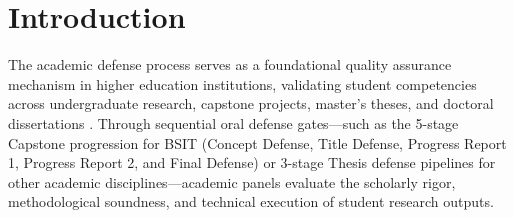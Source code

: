 \documentclass[sigplan,screen,nonacm]{acmart}
\begin{document}

\maketitle

\section{Introduction}

The academic defense process serves as a foundational quality assurance mechanism in higher education institutions, validating student competencies across undergraduate research, capstone projects, master's theses, and doctoral dissertations \cite{ched2015cmo25, erradi2012automated}. Through sequential oral defense gates---such as the 5-stage Capstone progression for BSIT (Concept Defense, Title Defense, Progress Report 1, Progress Report 2, and Final Defense) or 3-stage Thesis defense pipelines for other academic disciplines---academic panels evaluate the scholarly rigor, methodological soundness, and technical execution of student research outputs.
\end{document}
